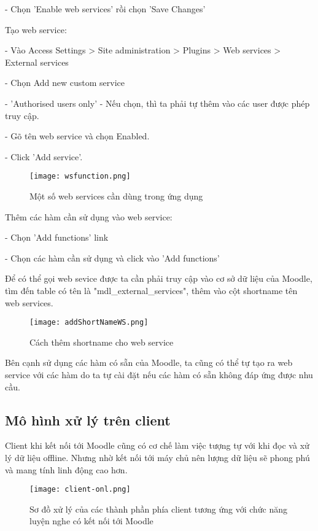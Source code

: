 \quad - Chọn 'Enable web services' rồi chọn 'Save Changes'

Tạo web service:

\quad - Vào Access Settings > Site administration > Plugins > Web services > External services

\quad - Chọn Add new custom service

\quad - 'Authorised users only' - Nếu chọn, thì ta phải tự thêm vào các user được phép truy cập.
 
\quad - Gõ tên web service và chọn Enabled.

\quad - Click 'Add service'.

\begin{figure}[!htb] 
\centering
\texttt{[image: wsfunction.png]}
\caption{Một số web services cần dùng trong ứng dụng}
\end{figure}

Thêm các hàm cần sử dụng vào web service:

\quad - Chọn 'Add functions' link

\quad - Chọn các hàm cần sử dụng và click vào 'Add functions'

Để có thể gọi web sevice được ta cần phải truy cập vào cơ sở dữ liệu của Moodle, tìm đến table có tên là "mdl\_external\_services", thêm vào cột shortname tên web services.

\begin{figure}[!htb] 
\centering
\texttt{[image: addShortNameWS.png]}
\caption{Cách thêm shortname cho web service}
\end{figure}
 
Bên cạnh sử dụng các hàm có sẵn của Moodle, ta cũng có thể tự tạo ra web service với các hàm do ta tự cài đặt nếu các hàm có sẵn không đáp ứng được nhu cầu.

\subsection{Mô hình xử lý trên client}

Client khi kết nối tới Moodle cũng có cơ chế làm việc tượng tự với khi đọc và xử lý dữ liệu offline. Nhưng nhờ kết nối tới máy chủ nên lượng dữ liệu sẽ phong phú và mang tính linh động cao hơn.

\begin{figure}[!htb] 
\centering
\texttt{[image: client-onl.png]}
\caption{Sơ đồ xử lý của các thành phần phía client tương ứng với chức năng luyện nghe có kết nối tới Moodle}
\end{figure}

